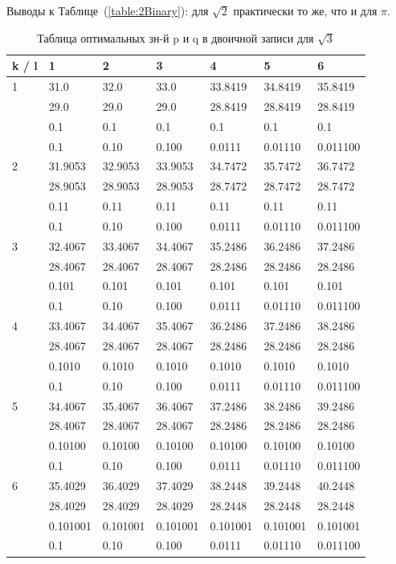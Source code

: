 \documentclass[12pt]{article}
\begin{document}
	Выводы к Таблице~(\ref{table:2Binary}): для $\sqrt{2}$ практически то же, что и для $\pi$.
	
	\begin{table}[h]
		\caption{Таблица оптимальных зн-й p и q в двоичной записи для $\sqrt{3}$}
		\label{table:3Binary}
		\begin{center}
			\begin{tabular}{|l|l|l|l|l|l|l|}
				\hline
				k / l &1 & 2 & 3 & 4 & 5 & 6\\
				\hline
				1 & 31.0& 32.0& 33.0& 33.8419& 34.8419& 35.8419\\
				& 29.0& 29.0& 29.0& 28.8419& 28.8419& 28.8419\\
				& 0.1& 0.1& 0.1& 0.1& 0.1& 0.1\\
				& 0.1& 0.10& 0.100& 0.0111& 0.01110& 0.011100\\
				\hline
				2 & 31.9053& 32.9053& 33.9053& 34.7472& 35.7472& 36.7472\\
				& 28.9053& 28.9053& 28.9053& 28.7472& 28.7472& 28.7472\\
				& 0.11& 0.11& 0.11& 0.11& 0.11& 0.11\\
				& 0.1& 0.10& 0.100& 0.0111& 0.01110& 0.011100\\
				\hline
				3 & 32.4067& 33.4067& 34.4067& 35.2486& 36.2486& 37.2486\\
				& 28.4067& 28.4067& 28.4067& 28.2486& 28.2486& 28.2486\\
				& 0.101& 0.101& 0.101& 0.101& 0.101& 0.101\\
				& 0.1& 0.10& 0.100& 0.0111& 0.01110& 0.011100\\
				\hline
				4 & 33.4067& 34.4067& 35.4067& 36.2486& 37.2486& 38.2486\\
				& 28.4067& 28.4067& 28.4067& 28.2486& 28.2486& 28.2486\\
				& 0.1010& 0.1010& 0.1010& 0.1010& 0.1010& 0.1010\\
				& 0.1& 0.10& 0.100& 0.0111& 0.01110& 0.011100\\
				\hline
				5 & 34.4067& 35.4067& 36.4067& 37.2486& 38.2486& 39.2486\\
				& 28.4067& 28.4067& 28.4067& 28.2486& 28.2486& 28.2486\\
				& 0.10100& 0.10100& 0.10100& 0.10100& 0.10100& 0.10100\\
				& 0.1& 0.10& 0.100& 0.0111& 0.01110& 0.011100\\
				\hline
				6 & 35.4029& 36.4029& 37.4029& 38.2448& 39.2448& 40.2448\\
				& 28.4029& 28.4029& 28.4029& 28.2448& 28.2448& 28.2448\\
				& 0.101001& 0.101001& 0.101001& 0.101001& 0.101001& 0.101001\\
				& 0.1& 0.10& 0.100& 0.0111& 0.01110& 0.011100\\
				\hline
			\end{tabular}
		\end{center}
	\end{table}
	
\end{document}
